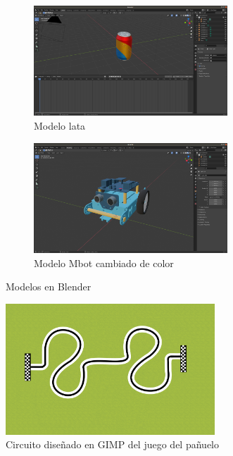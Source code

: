 \begin{figure}[H]
  \begin{subfigure}[b]{0.5\textwidth}
  \centering
    \includegraphics[width=0.8\textwidth, height=0.5\textwidth]{chapters/images/lata.png}
    \caption{Modelo lata}
    \label{fig:f1}
  \end{subfigure}
  \hfill
  \begin{subfigure}[b]{0.5\textwidth}
  \centering
    \includegraphics[width=0.8\textwidth, height=0.5\textwidth]{chapters/images/mbotbase.png}
	\caption{Modelo Mbot cambiado de color}    
    \label{fig:f2}
 
  \end{subfigure}
  \caption{Modelos en Blender}
\end{figure}

\begin{figure}[H]
  \centering
 \includegraphics[width=0.7\textwidth, height=0.4\textwidth]{chapters/images/handkerchief.png}
  \caption{Circuito diseñado en GIMP del juego del pañuelo}
\end{figure}

